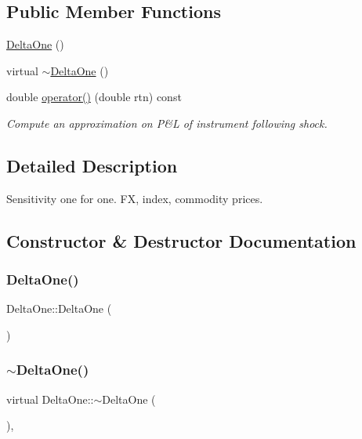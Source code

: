 \subsection*{Public Member Functions}
\begin{DoxyCompactItemize}
\item 
\hyperlink{classDeltaOne_a4f3965ead9df38e2cf4a3934b1ea468e}{Delta\+One} ()
\item 
virtual \hyperlink{classDeltaOne_af954cd06f4df10cdc02244aeda02e7c5}{$\sim$\+Delta\+One} ()
\item 
double \hyperlink{classDeltaOne_a8dd4b5243412ab399b07c1128262f570}{operator()} (double rtn) const
\begin{DoxyCompactList}\small\item\em Compute an approximation on P\&L of instrument following shock. \end{DoxyCompactList}\end{DoxyCompactItemize}


\subsection{Detailed Description}
Sensitivity one for one. FX, index, commodity prices. 

\subsection{Constructor \& Destructor Documentation}
\hypertarget{classDeltaOne_a4f3965ead9df38e2cf4a3934b1ea468e}{}\label{classDeltaOne_a4f3965ead9df38e2cf4a3934b1ea468e} 
\subsubsection{\texorpdfstring{Delta\+One()}{DeltaOne()}}
{\footnotesize\ttfamily Delta\+One\+::\+Delta\+One (\begin{DoxyParamCaption}{ }\end{DoxyParamCaption})}

\hypertarget{classDeltaOne_af954cd06f4df10cdc02244aeda02e7c5}{}\label{classDeltaOne_af954cd06f4df10cdc02244aeda02e7c5} 
\subsubsection{\texorpdfstring{$\sim$\+Delta\+One()}{~DeltaOne()}}
{\footnotesize\ttfamily virtual Delta\+One\+::$\sim$\+Delta\+One (\begin{DoxyParamCaption}{ }\end{DoxyParamCaption})\hspace{0.3cm}{\ttfamily [inline]}, {\ttfamily [virtual]}}



